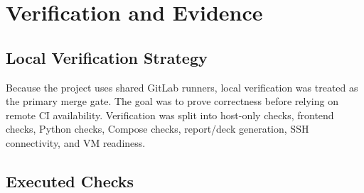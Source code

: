 \documentclass[12pt,a4paper]{report}
\begin{document}
\chapter{Verification and Evidence}
\label{ch:verification}

\section{Local Verification Strategy}
\label{sec:verification-strategy}

Because the project uses shared GitLab runners, local verification was treated as
the primary merge gate. The goal was to prove correctness before relying on
remote CI availability. Verification was split into host-only checks, frontend
checks, Python checks, Compose checks, report/deck generation, SSH connectivity,
and VM readiness.

\section{Executed Checks}
\label{sec:executed-checks}
\end{document}
